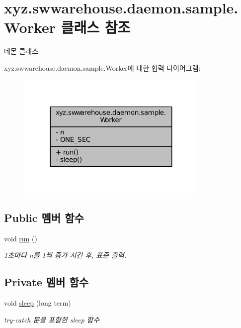\hypertarget{classxyz_1_1swwarehouse_1_1daemon_1_1sample_1_1_worker}{\section{xyz.\+swwarehouse.\+daemon.\+sample.\+Worker 클래스 참조}
\label{classxyz_1_1swwarehouse_1_1daemon_1_1sample_1_1_worker}
}


데몬 클래스  




xyz.\+swwarehouse.\+daemon.\+sample.\+Worker에 대한 협력 다이어그램\+:
\nopagebreak
\begin{figure}[H]
\begin{center}
\leavevmode
\includegraphics[width=263pt]{classxyz_1_1swwarehouse_1_1daemon_1_1sample_1_1_worker__coll__graph}
\end{center}
\end{figure}
\subsection*{Public 멤버 함수}
\begin{DoxyCompactItemize}
\item 
void \hyperlink{classxyz_1_1swwarehouse_1_1daemon_1_1sample_1_1_worker_af1bf199e3277a2946e59c7acc5416731}{run} ()
\begin{DoxyCompactList}\small\item\em 1초마다 n를 1씩 증가 시킨 후, 표준 출력. \end{DoxyCompactList}\end{DoxyCompactItemize}
\subsection*{Private 멤버 함수}
\begin{DoxyCompactItemize}
\item 
void \hyperlink{classxyz_1_1swwarehouse_1_1daemon_1_1sample_1_1_worker_ae9991783aa9ada529a18ecb5abdb4ad7}{sleep} (long term)
\begin{DoxyCompactList}\small\item\em try-\/catch 문을 포함한 sleep 함수 \end{DoxyCompactList}\end{DoxyCompactItemize}
